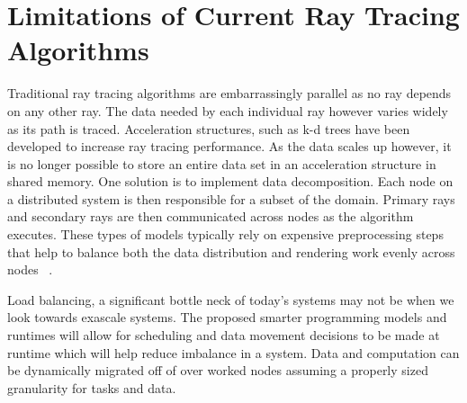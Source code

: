 \section{Limitations of Current Ray Tracing Algorithms}

Traditional ray tracing algorithms are embarrassingly parallel as no ray depends on any other ray. The data needed by each individual ray however varies widely as its path is traced. Acceleration structures, such as k-d trees have been developed to increase ray tracing performance. As the data scales up however, it is no longer possible to store an entire data set in an acceleration structure in shared memory. One solution is to implement data decomposition. Each node on a distributed system is then responsible for a subset of the domain. Primary rays and secondary rays are then communicated across nodes as the algorithm executes. These types of models typically rely on expensive preprocessing steps that help to balance both the data distribution and rendering work evenly across nodes ~\cite{navratil2014dynamic}.  

Load balancing, a significant bottle neck of today’s systems may not be when we look towards exascale systems.  The proposed smarter programming models and runtimes will allow for scheduling and data movement decisions to be made at runtime which will help reduce imbalance in a system.  Data and computation can be dynamically migrated off of over worked nodes assuming a properly sized granularity for tasks and data. 


